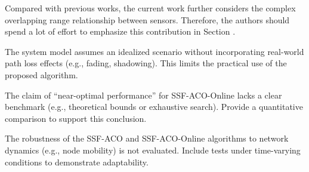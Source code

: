 \reviewer

\begin{revcomment}
	Compared with previous works, the current work further considers the complex overlapping range relationship between sensors. Therefore, the authors should spend a lot of effort to emphasize this contribution in Section .
\end{revcomment}
\begin{revresponse}
	
	
	
\end{revresponse}

\begin{revcomment}
	The system model assumes an idealized scenario without incorporating real-world path loss effects (e.g., fading, shadowing). This limits the practical use of the proposed algorithm.
\end{revcomment}
\begin{revresponse}
	
\end{revresponse}

\begin{revcomment}
	The claim of ``near-optimal performance'' for SSF-ACO-Online lacks a clear benchmark (e.g., theoretical bounds or exhaustive search). Provide a quantitative comparison to support this conclusion.
\end{revcomment}
\begin{revresponse}
	
\end{revresponse}

\begin{revcomment}
	The robustness of the SSF-ACO and SSF-ACO-Online algorithms to network dynamics (e.g., node mobility) is not evaluated. Include tests under time-varying conditions to demonstrate adaptability.
\end{revcomment}
\begin{revresponse}
	
\end{revresponse}

